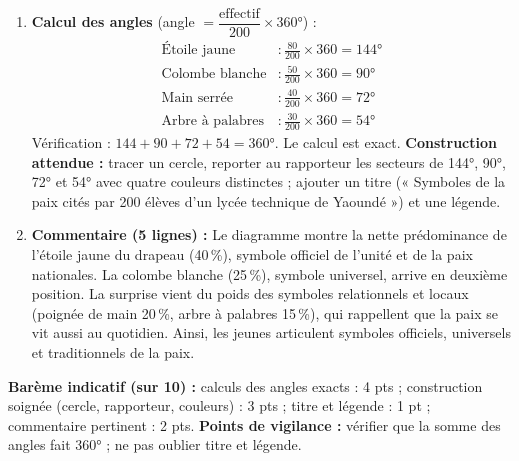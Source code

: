 \documentclass[11pt]{article}
\begin{document}
\begin{corrige}
\begin{enumerate}
\item \textbf{Calcul des angles} (angle $= \dfrac{\text{effectif}}{200} \times 360°$) :
\begin{align*}
\text{Étoile jaune} &: \frac{80}{200} \times 360 = 144° \\
\text{Colombe blanche} &: \frac{50}{200} \times 360 = 90° \\
\text{Main serrée} &: \frac{40}{200} \times 360 = 72° \\
\text{Arbre à palabres} &: \frac{30}{200} \times 360 = 54°
\end{align*}
Vérification : $144 + 90 + 72 + 54 = 360°$. Le calcul est exact.
\textbf{Construction attendue :} tracer un cercle, reporter au rapporteur les secteurs de 144°, 90°, 72° et 54° avec quatre couleurs distinctes ; ajouter un titre (« Symboles de la paix cités par 200 élèves d'un lycée technique de Yaoundé ») et une légende.
\item \textbf{Commentaire (5 lignes) :} Le diagramme montre la nette prédominance de l'étoile jaune du drapeau (40\,\%), symbole officiel de l'unité et de la paix nationales. La colombe blanche (25\,\%), symbole universel, arrive en deuxième position. La surprise vient du poids des symboles relationnels et locaux (poignée de main 20\,\%, arbre à palabres 15\,\%), qui rappellent que la paix se vit aussi au quotidien. Ainsi, les jeunes articulent symboles officiels, universels et traditionnels de la paix.
\end{enumerate}
\textbf{Barème indicatif (sur 10) :} calculs des angles exacts : 4 pts ; construction soignée (cercle, rapporteur, couleurs) : 3 pts ; titre et légende : 1 pt ; commentaire pertinent : 2 pts.
\textbf{Points de vigilance :} vérifier que la somme des angles fait 360° ; ne pas oublier titre et légende.
\end{corrige}
\end{document}
